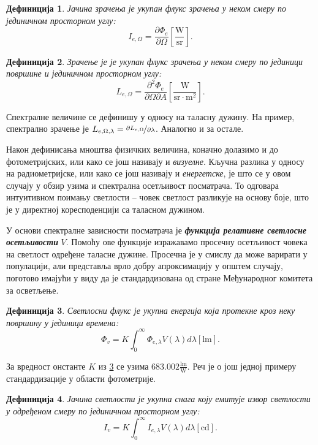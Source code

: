 \documentclass[12pt, a4paper, twoside]{book}
\numberwithin{equation}{chapter}
\numberwithin{theorem}{section}
\newtheorem{definition}{Дефиниција}
\numberwithin{definition}{section}
\numberwithin{definitionChapter}{chapter}
\begin{document}
\begin{definition}
	Јачина зрачења је укупан флукс зрачења у неком смеру по јединичном просторном углу:
	$$I_{e, \Omega} = \frac{\partial \Phi_e}{\partial \Omega} \left[\mathrm{\frac{W}{sr}}\right].$$
\end{definition}

\begin{definition}
	Зрачење је је укупан флукс зрачења у неком смеру по јединици површине и јединичном просторном углу:
	$$L_{e, \Omega} = \frac{\partial^2 \Phi_e}{\partial \Omega \partial A} \left[\mathrm{\frac{W}{sr \cdot m^2}}\right].$$
\end{definition}

Спектралне величине се дефинишу у односу на таласну дужину. На пример, спектрално зрачење
је $L_{e, \Omega, \lambda} = \nicefrac{\partial L_{e, \Omega}}{\partial \lambda}$.
Аналогно и за остале.

Након дефинисања мноштва физичких величина, коначно долазимо и до фотометријских, или како се
још називају и \textit{визуелне}. Кључна разлика у односу на радиометријске, или како се још
називају и \textit{енергетске}, је што се у овом случају у обзир узима и спектрална
осетљивост посматрача. То одговара интуитивном поимању светлости -- човек светлост разликује на
основу боје, што је у директној коресподенцији са таласном дужином.

У основи спектралне зависности посматрача је \textbf{\textit{функција релативне светлосне осетљивости}} $V$.
Помоћу ове функције изражавамо просечну осетљивост човека на светлост одређене таласне дужине.
Просечна је у смислу да може варирати у популацији, али представља врло добру апроксимацију
у општем случају, поготово имајући у виду да је стандардизована од стране Међународног комитета
за осветљење.

\begin{definition}
	Светлосни флукс је укупна енергија која протекне кроз неку површину у јединици времена:
	$$\Phi_v = K\int_{0}^{\infty}\Phi_{e, \lambda} V(\lambda)d\lambda \left[\mathrm{lm}\right].$$
	\label{eqn-luminuous-flux}
\end{definition}

За вредност онстанте $K$ из \ref{eqn-luminuous-flux} се узима $683.002 \mathrm{\frac{lm}{W}}$. Реч
је о још једној примеру стандардизације у области фотометрије.

\begin{definition}
	Јачина светлости је укупна снага коју емитује извор светлости у одређеном смеру по јединичном
	просторном углу:
	$$I_v = K \int_{0}^{\infty}I_{e, \lambda}V(\lambda)d\lambda \left[\mathrm{cd}\right].$$
\end{definition}
\end{document}
